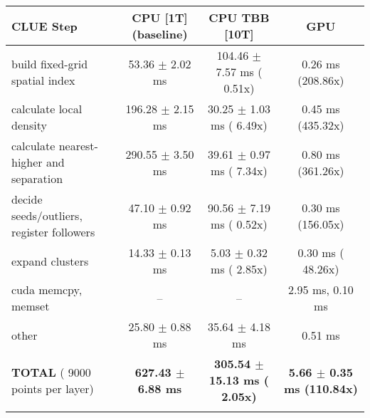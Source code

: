     \begin{tabular}{l|c|c|c}
    \hline
    CLUE Step                                 & CPU [1T] (baseline)         & CPU TBB [10T]                         & GPU                       \\ \hline
    build fixed-grid spatial index            &  53.36 $\pm$  2.02 ms       & 104.46 $\pm$  7.57 ms ( 0.51x)        &   0.26 ms (208.86x)       \\
    calculate local density                   & 196.28 $\pm$  2.15 ms       &  30.25 $\pm$  1.03 ms ( 6.49x)        &   0.45 ms (435.32x)       \\
    calculate nearest-higher and separation   & 290.55 $\pm$  3.50 ms       &  39.61 $\pm$  0.97 ms ( 7.34x)        &   0.80 ms (361.26x)       \\
    decide seeds/outliers, register followers &  47.10 $\pm$  0.92 ms       &  90.56 $\pm$  7.19 ms ( 0.52x)        &   0.30 ms (156.05x)       \\
    expand clusters                           &  14.33 $\pm$  0.13 ms       &   5.03 $\pm$  0.32 ms ( 2.85x)        &   0.30 ms ( 48.26x)       \\ \hline
    cuda memcpy, memset                       & --                          & --                                    &   2.95 ms,   0.10 ms      \\ 
    other                                     &  25.80 $\pm$  0.88 ms       &  35.64 $\pm$  4.18 ms                 &   0.51 ms                 \\ \hline
    \textbf{TOTAL} ( 9000 points per layer)   & \textbf{627.43 $\pm$  6.88 ms} & \textbf{305.54 $\pm$ 15.13 ms ( 2.05x)} & \textbf{  5.66 $\pm$  0.35 ms (110.84x)}  \\
    \hline
    \multicolumn{4}{c}{} 
    \end{tabular}
    \linebreak


